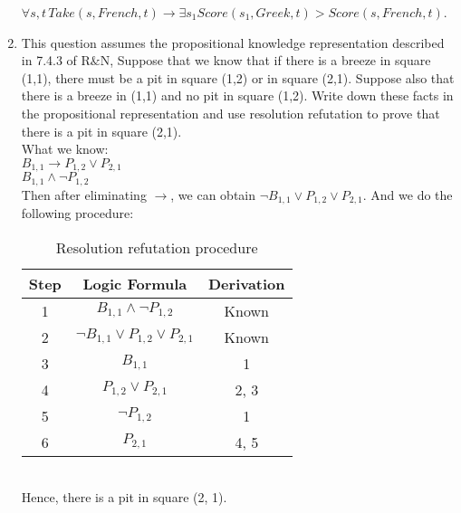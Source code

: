 \documentclass[12pt]{article}
\begin{document}
\begin{enumerate}
$\forall s, t\, Take(s, French, t)\rightarrow\exists s_1 Score(s_1, Greek, t)>Score(s, French, t)$. 
\item This question assumes the propositional knowledge representation described in 7.4.3 of R$\&$N, Suppose that we know that if there is a breeze in square (1,1), there must be a pit in square (1,2) or in square (2,1).  Suppose also that there is a breeze in (1,1) and no pit in square (1,2).  Write down these facts in the propositional representation and use resolution refutation to prove that there is a pit in square (2,1). \\
What we know: \\
$B_{1, 1}\rightarrow P_{1, 2}\vee P_{2, 1}$\\
$B_{1, 1}\wedge\neg P_{1, 2}$\\
Then after eliminating $\rightarrow$, we can obtain $\neg B_{1, 1}\vee P_{1, 2}\vee P_{2, 1}$. And we do the following procedure: 
\begin{table}[htbp]
\caption{Resolution refutation procedure}
\centering
\begin{tabular}{ccc}
\toprule
Step & Logic Formula & Derivation\\
\midrule
1 & $B_{1, 1}\wedge\neg P_{1, 2}$ & Known\\
2 & $\neg B_{1, 1}\vee P_{1, 2}\vee P_{2, 1}$ & Known\\
3 & $B_{1, 1}$ & 1\\
4 & $P_{1, 2}\vee P_{2, 1}$ & 2, 3\\
5 & $\neg P_{1, 2}$ & 1\\
6 & $P_{2, 1}$ & 4, 5\\
\bottomrule
\end{tabular}
\end{table}\\
Hence, there is a pit in square (2, 1). 
\end{enumerate}
\end{document}
